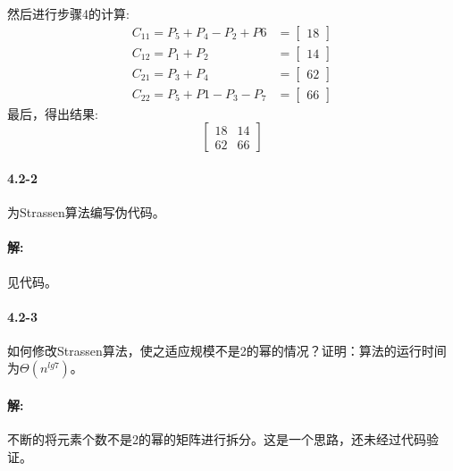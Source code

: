 \documentclass[a4paper,11pt]{article}
\begin{document}
然后进行步骤4的计算:
\begin{align*}
	C_{11} = P_{5} + P_{4} - P_{2} + P{6} &=
	\begin{bmatrix}
		18
	\end{bmatrix}\\
	C_{12} = P_{1} + P_{2} &=
	\begin{bmatrix}
		14
	\end{bmatrix}\\
	C_{21} = P_{3} + P_{4} &=
	\begin{bmatrix}
		62
	\end{bmatrix}\\
	C_{22} = P_{5}+P{1}-P_{3}-P_{7} &=
	\begin{bmatrix}
		66
	\end{bmatrix}
\end{align*}
最后，得出结果:
\[
	\begin{bmatrix}
	18 & 14\\
	62 & 66
	\end{bmatrix}
\]
\paragraph*{4.2-2}
为Strassen算法编写伪代码。
\paragraph*{解:}见代码。
\paragraph*{4.2-3}如何修改Strassen算法，使之适应规模不是2的幂的情况？证明：算法的运行时间为$\Theta(n^{lg7})$。
\paragraph*{解:}不断的将元素个数不是2的幂的矩阵进行拆分。这是一个思路，还未经过代码验证。
\end{document}
